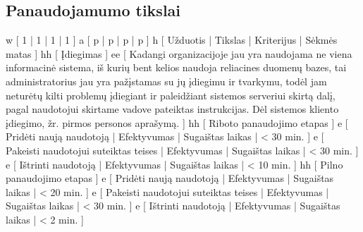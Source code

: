\subsection{Panaudojamumo tikslai}
\xtable
{
  w [ 1 | 1 | 1 | 1 ]
  a [ p | p | p | p ]
  h [ Užduotis | Tikslas | Kriterijus | Sėkmės matas ]
  hh [ Įdiegimas ]
  ee
  [
    Kadangi organizacijoje jau yra naudojama ne viena informacinė
    sistema, iš kurių bent kelios naudoja reliacines duomenų bazes,
    tai administratorius jau yra pažįstamas su jų įdiegimu ir
    tvarkymu, todėl jam neturėtų kilti problemų įdiegiant ir paleidžiant
    sistemos serveriui skirtą dalį, pagal naudotojui skirtame vadove
    pateiktas instrukcijas. Dėl sistemos kliento įdiegimo, žr.
    pirmos personos aprašymą.
  ]
  hh [ Riboto panaudojimo etapas ]
  e [ Pridėti naują naudotoją | Efektyvumas | Sugaištas laikas | < 30 min. ]
  e [ Pakeisti naudotojui suteiktas teises | Efektyvumas | Sugaištas laikas | < 30 min. ]
  e [ Ištrinti naudotoją | Efektyvumas | Sugaištas laikas | < 10 min. ]
  hh [ Pilno panaudojimo etapas ]
  e [ Pridėti naują naudotoją | Efektyvumas | Sugaištas laikas | < 20 min. ]
  e [ Pakeisti naudotojui suteiktas teises | Efektyvumas | Sugaištas laikas | < 30 min. ]
  e [ Ištrinti naudotoją | Efektyvumas | Sugaištas laikas | < 2 min. ]
}
